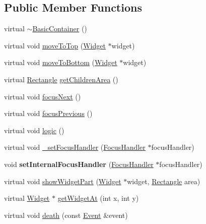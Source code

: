 \subsection*{Public Member Functions}
\begin{DoxyCompactItemize}
\item 
virtual \hyperlink{classgcn_1_1BasicContainer_ae70f53b73c7883b52105c714941c6052}{$\sim$\+Basic\+Container} ()
\item 
virtual void \hyperlink{classgcn_1_1BasicContainer_aa7b839a750b130894a3cc0c3fcbfa616}{move\+To\+Top} (\hyperlink{classgcn_1_1Widget}{Widget} $\ast$widget)
\item 
virtual void \hyperlink{classgcn_1_1BasicContainer_af1cd1b60207ccb0ae7263f8a34cce6b3}{move\+To\+Bottom} (\hyperlink{classgcn_1_1Widget}{Widget} $\ast$widget)
\item 
virtual \hyperlink{classgcn_1_1Rectangle}{Rectangle} \hyperlink{classgcn_1_1BasicContainer_a8ed853146d726cb3bc5d109ad52203d6}{get\+Children\+Area} ()
\item 
virtual void \hyperlink{classgcn_1_1BasicContainer_abc34133a4451f7ffce91ac4fcb7c63c9}{focus\+Next} ()
\item 
virtual void \hyperlink{classgcn_1_1BasicContainer_a480e30833f2d7af7283ea5c7ea4bb1b0}{focus\+Previous} ()
\item 
virtual void \hyperlink{classgcn_1_1BasicContainer_a65972968364c62bf244985b2900eaf25}{logic} ()
\item 
virtual void \hyperlink{classgcn_1_1BasicContainer_a90e4cc263111652a8c50d5395945bb65}{\+\_\+set\+Focus\+Handler} (\hyperlink{classgcn_1_1FocusHandler}{Focus\+Handler} $\ast$focus\+Handler)
\item 
void {\bfseries set\+Internal\+Focus\+Handler} (\hyperlink{classgcn_1_1FocusHandler}{Focus\+Handler} $\ast$focus\+Handler)\hypertarget{classgcn_1_1BasicContainer_a8d6ab7ef2f9a60d014783b712b9bca8f}{}\label{classgcn_1_1BasicContainer_a8d6ab7ef2f9a60d014783b712b9bca8f}

\item 
virtual void \hyperlink{classgcn_1_1BasicContainer_a5843702859ccb407f308cbe5d8987d28}{show\+Widget\+Part} (\hyperlink{classgcn_1_1Widget}{Widget} $\ast$widget, \hyperlink{classgcn_1_1Rectangle}{Rectangle} area)
\item 
virtual \hyperlink{classgcn_1_1Widget}{Widget} $\ast$ \hyperlink{classgcn_1_1BasicContainer_a99fd5e886776ec35d296c40755462a48}{get\+Widget\+At} (int x, int y)
\item 
virtual void \hyperlink{classgcn_1_1BasicContainer_ac6cf8760537dcd167e0f518f556bccf4}{death} (const \hyperlink{classgcn_1_1Event}{Event} \&event)
\end{DoxyCompactItemize}
